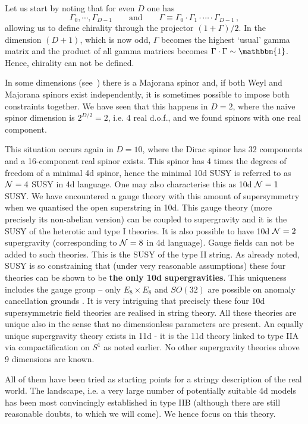 \documentclass[12pt]{article}
\newcommand{\be}{\begin{equation}}
\newcommand{\ee}{\end{equation}}
\numberwithin{equation}{section}
\begin{document}
Let us start by noting that for even $D$ one has
\be
\Gamma_0,\cdots, \Gamma_{D-1} \qquad \mbox{and}\qquad \Gamma\equiv \Gamma_0\cdot \Gamma_1\cdot \cdots \cdot \Gamma_{D-1}\,,
\ee
allowing us to define chirality through the projector $(1+\Gamma)/2$. In the dimension $(D+1)$, which is now odd, $\Gamma$ becomes the highest `usual' gamma matrix and the product of all gamma matrices becomes $\Gamma\cdot\Gamma \sim \mathbbm{1}$. Hence, chirality can not be defined. 

In some dimensions (see~\cite{Polchinski:1998rq}) there is a Majorana spinor and, if both Weyl and Majorana spinors exist independently, it is sometimes possible to impose both constraints together. We have seen that this happens in $D=2$, where the naive spinor dimension is $2^{D/2}=2$, i.e. 4 real d.o.f., and we found spinors with one real component. 

This situation occurs again in $D=10$, where the Dirac spinor has 32 components and a 16-component real spinor exists. This spinor has 4 times the degrees of freedom of a minimal 4d spinor, hence the minimal 10d SUSY is referred to as ${\cal N}=4$ SUSY in 4d language. One may also characterise this as 10d ${\cal N}=1$ SUSY. We have encountered a gauge theory with this amount of supersymmetry when we quantised the open superstring in 10d. This gauge theory (more precisely its non-abelian version) can be coupled to supergravity and it is the SUSY of the heterotic and type I theories. It is also possible to have 10d ${\cal N}=2$ supergravity (corresponding to ${\cal N}=8$ in 4d language). Gauge fields can not be added to such theories. This is the SUSY of the type II string. As already noted, SUSY is so constraining that (under very reasonable assumptions) these four theories can be shown to be {\bf the only 10d supergravities}. This uniqueness includes the gauge group -- only $E_8\times E_8$ and $SO(32)$ are possible on anomaly cancellation grounds \cite{Green:1984sg}. It is very intriguing that precisely these four 10d supersymmetric field theories are realised in string theory. All these theories are unique also in the sense that no dimensionless parameters are present. An equally unique supergravity theory exists in 11d - it is the 11d theory linked to type IIA via compactification on $S^1$ as noted earlier. No other supergravity theories above 9 dimensions are known.

All of them have been tried as starting points for a stringy description of the real world. The landscape, i.e. a very large number of potentially suitable 4d models has been most convincingly established in type IIB (although there are still reasonable doubts, to which we will come). We hence focus on this theory.
\end{document}
